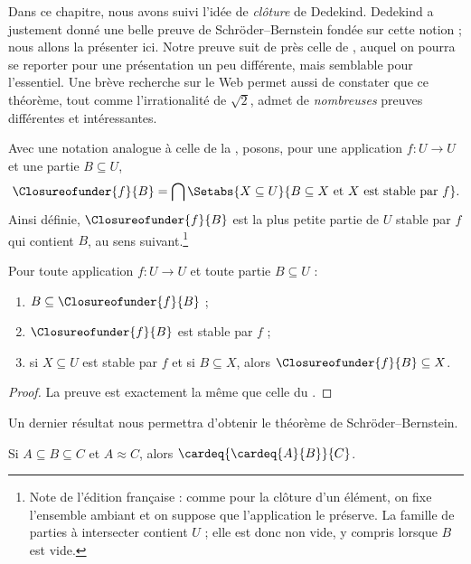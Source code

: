 \documentclass[11pt,a4paper,openany]{memoir}
\begin{document}
Dans ce chapitre, nous avons suivi l'idée de \emph{clôture} de Dedekind.
Dedekind a justement donné une belle preuve de Schröder--Bernstein
fondée sur cette notion ; nous allons la présenter ici. Notre preuve
suit de près celle de \citet[pp.~157--8]{Potter2004}, auquel on pourra
se reporter pour une présentation un peu différente, mais semblable
pour l'essentiel. Une brève recherche sur le Web permet aussi de constater
que ce théorème, tout comme l'irrationalité de $\sqrt{2}$, admet de
\emph{nombreuses} preuves différentes et intéressantes.

Avec une notation analogue à celle de la
, posons, pour une application
$f\colon U\to U$ et une partie $B\subseteq U$,
\[
\Closureofunder{f}{B} = \bigcap \Setabs{X\subseteq U}{B \subseteq X
\text{ et }X\text{ est stable par }f}.
\]
Ainsi définie, $\Closureofunder{f}{B}$ est la plus petite partie de $U$
stable par $f$ qui contient $B$, au sens suivant.\footnote{Note de
l'édition française : comme pour la clôture d'un élément, on fixe
l'ensemble ambiant et on suppose que l'application le préserve.
La famille de parties à intersecter contient $U$ ; elle est donc
non vide, y compris lorsque $B$ est vide.}

\begin{lem}
	Pour toute application $f\colon U\to U$ et toute partie $B\subseteq U$ :
	\begin{enumerate}
		\item{} $B \subseteq \Closureofunder{f}{B}$ ;
		\item{} $\Closureofunder{f}{B}$ est stable par $f$ ;
		\item{} si $X\subseteq U$ est stable par $f$
		et si $B\subseteq X$, alors $\Closureofunder{f}{B}\subseteq X$.
	\end{enumerate}
\end{lem}

\begin{proof}
La preuve est exactement la même que celle du
.
\end{proof}

Un dernier résultat nous permettra d'obtenir le théorème de
Schröder--Bernstein.

\begin{prop}
Si $A \subseteq B \subseteq C$ et $A \approx C$, alors
$\cardeq{\cardeq{A}{B}}{C}$.
\end{prop}
\end{document}
